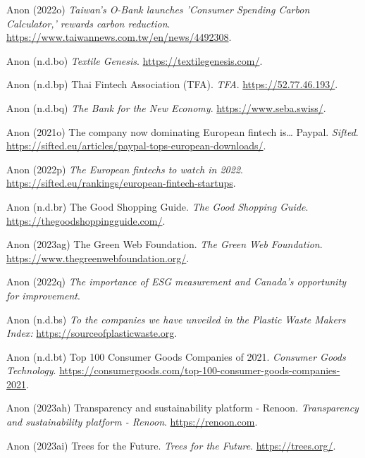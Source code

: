 \documentclass[
  letterpaper,
  DIV=11,
  numbers=noendperiod]{scrartcl}
\newlength{\cslhangindent}
\newenvironment{CSLReferences}[2] %
 {\begin{list}{}{%
  \setlength{\itemindent}{0pt}
  \setlength{\leftmargin}{0pt}
  \setlength{\parsep}{0pt}
  \ifodd #1
   \setlength{\leftmargin}{\cslhangindent}
   \setlength{\itemindent}{-1\cslhangindent}
  \fi
  \setlength{\itemsep}{#2\baselineskip}}}
 {\end{list}}
\begin{document}
\begin{CSLReferences}{0}{1}
Anon (2022o) \emph{Taiwan's {O-Bank} launches '{Consumer Spending Carbon
Calculator},' rewards carbon reduction}.
\url{https://www.taiwannews.com.tw/en/news/4492308}.

Anon (n.d.bo) \emph{Textile {Genesis}}.
\url{https://textilegenesis.com/}.

Anon (n.d.bp) Thai {Fintech Association} ({TFA}). \emph{TFA}.
\url{https://52.77.46.193/}.

Anon (n.d.bq) \emph{The {Bank} for the {New Economy}}.
\url{https://www.seba.swiss/}.

Anon (2021o) The company now dominating {European} fintech is{\ldots{}}
{Paypal}. \emph{Sifted}.
\url{https://sifted.eu/articles/paypal-tops-european-downloads/}.

Anon (2022p) \emph{The {European} fintechs to watch in 2022}.
\url{https://sifted.eu/rankings/european-fintech-startups}.

Anon (n.d.br) The {Good Shopping Guide}. \emph{The Good Shopping Guide}.
\url{https://thegoodshoppingguide.com/}.

Anon (2023ag) The {Green Web Foundation}. \emph{The Green Web
Foundation}. \url{https://www.thegreenwebfoundation.org/}.

Anon (2022q) \emph{The importance of {ESG} measurement and {Canada}'s
opportunity for improvement}.

Anon (n.d.bs) \emph{To the companies we have unveiled in the {Plastic
Waste Makers Index}:} \url{https://sourceofplasticwaste.org}.

Anon (n.d.bt) Top 100 {Consumer Goods Companies} of 2021. \emph{Consumer
Goods Technology}.
\url{https://consumergoods.com/top-100-consumer-goods-companies-2021}.

Anon (2023ah) Transparency and sustainability platform - {Renoon}.
\emph{Transparency and sustainability platform - Renoon}.
\url{https://renoon.com}.

Anon (2023ai) Trees for the {Future}. \emph{Trees for the Future}.
\url{https://trees.org/}.


\end{CSLReferences}
\end{document}
